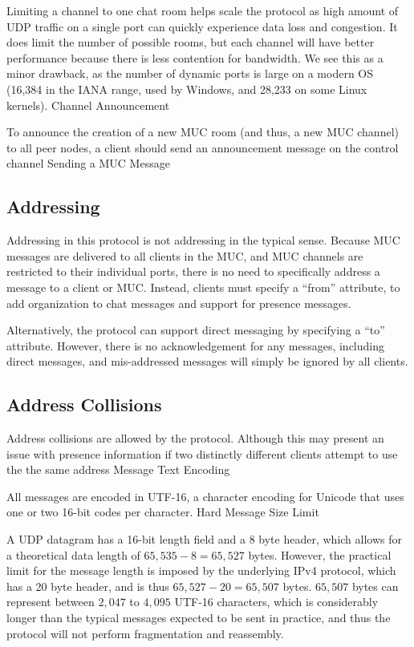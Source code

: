 \documentclass{article}
\begin{document}
Limiting a channel to one chat room helps scale the protocol as high amount of
UDP traffic on a single port can quickly experience data loss and congestion. It
does limit the number of possible rooms, but each channel will have better
performance because there is less contention for bandwidth. We see this as a
minor drawback, as the number of dynamic ports is large on a modern OS (16,384
in the IANA range, used by Windows, and 28,233 on some Linux kernels).
Channel Announcement

To announce the creation of a new MUC room (and thus, a new MUC channel) to all
peer nodes, a client should send an announcement message on the control channel 
Sending a MUC Message

\subsection{Addressing}

Addressing in this protocol is not addressing in the typical sense. Because MUC
messages are delivered to all clients in the MUC, and MUC channels are
restricted to their individual ports, there is no need to specifically address a
message to a client or MUC. Instead, clients must specify a ``from'' attribute, to
add organization to chat messages and support for presence messages.

Alternatively, the protocol can support direct messaging by specifying a ``to''
attribute. However, there is no acknowledgement for any messages, including
direct messages, and mis-addressed messages will simply be ignored by all
clients.

\subsection{Address Collisions}
Address collisions are allowed by the protocol. Although this may present an
issue with presence information if two distinctly different clients attempt to
use the the same address
Message Text Encoding

All messages are encoded in UTF-16, a character encoding for Unicode that uses
one or two 16-bit codes per character.
Hard Message Size Limit

A UDP datagram has a 16-bit length field and a 8 byte header, which allows for a
theoretical data length of $65,535 - 8 = 65,527$ bytes. However, the practical
limit for the message length is imposed by the underlying IPv4 protocol, which
has a 20 byte header, and is thus $65,527 - 20 = 65,507$ bytes. $65,507$ bytes can
represent between $2,047$ to $4,095$ UTF-16 characters, which is considerably longer
than the typical messages expected to be sent in practice, and thus the
protocol will not perform fragmentation and reassembly.
\end{document}
